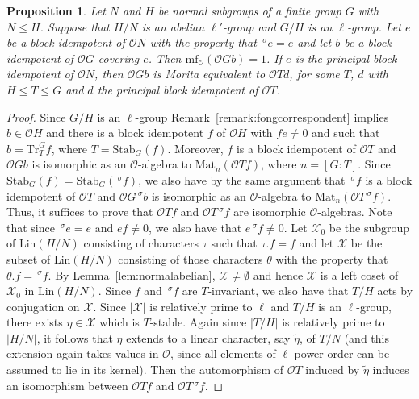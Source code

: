 \documentclass{amsart}
\theoremstyle{plain}\newtheorem{Theorem}{Theorem}[section]
\theoremstyle{plain}\newtheorem{Conjecture}[Theorem]{Conjecture}
\theoremstyle{plain}\newtheorem{Corollary}[Theorem]{Corollary}
\theoremstyle{plain}\newtheorem{Lemma}[Theorem]{Lemma}
\theoremstyle{plain}\newtheorem{Proposition}[Theorem]{Proposition}
\theoremstyle{definition}\newtheorem{Definition}[Theorem]{Definition}
\theoremstyle{definition}\newtheorem{Example}[Theorem]{Example}
\theoremstyle{definition}\newtheorem{Examples}[Theorem]{Examples}
\theoremstyle{definition}\newtheorem{Exercise}[Theorem]{Exercise}
\theoremstyle{definition}\newtheorem{Notation}[Theorem]{Notation}
\theoremstyle{definition}\newtheorem{Remark}[Theorem]{Remark}
\theoremstyle{definition}\newtheorem{Remarks}[Theorem]{Remarks}
\def\CO{{\mathcal{O}}}    \def\OPE{{\mathcal{O}(P\rtimes E)}}
\def\CX{{\mathcal{X}}}
\def\Tr{\mathrm{Tr}}             \def\tenOT{\otimes_{\mathcal{O}T}}
\def\mf{\mathrm{mf}}             \def\tenOGb{\otimes_{\mathcal{O}Gb}}
\def\Stab{\mathrm{Stab}}
\numberwithin{equation}{section}
\begin{document}
\begin{Proposition} \label{prop:frobeniusnormal}   Let $N$
and $H$ be normal subgroups of a  finite group $G$ with $N \leq H$. Suppose that  $H/N$ is  an abelian $\ell'$-group and  $G/H$ is an $\ell$-group.    Let $e$  be a block idempotent of  $\CO N $  with the property that $\,^\sigma  e = e$  and let $b$ be a block idempotent of $\CO G$  covering  $e$. Then $\mf_\CO(\CO G b)=1$.     If   $e$ is the principal block  idempotent of $\CO N$, then  $\CO Gb $  is Morita equivalent to  $\CO  Td$,   for some $T$, $d$  with  $ H\leq  T \leq G$  and   $d$ the principal block idempotent of   $\CO T$.
\end{Proposition}



\begin{proof}    Since $G/H$ is an $\ell$-group Remark~\ref{remark:fongcorrespondent} implies $b \in   \CO  H$  and there is  a  block idempotent $f$ of $\CO H $  with $fe \ne 0 $   and  such that  $b= \Tr_{T}^G  f$, where  $T=  \Stab_G(f)$. Moreover, $f$  is a block idempotent of  $\CO T$  and   $\CO  Gb $  is isomorphic  as an $\CO$-algebra to  $\mathrm{Mat}_n (\CO  T f)$, where $ n= [G : T]$.     Since  $\Stab_G(f)  = \Stab_G (\,^\sigma f) $, we   also have   by the same argument that  
$\,^\sigma f $ is a block idempotent  of $\CO T $ and $\CO G \,^\sigma b $  is isomorphic  as an $\CO$-algebra  to  $\mathrm{Mat}_n (\CO T \,^\sigma f)$. Thus, it suffices to prove that  $\CO  T f  $  and  $\CO  T\,^\sigma f $  are  isomorphic  $\CO$-algebras.   Note that   since  $\,^\sigma e =e$  and $ e f \ne 0$, we also have that  $e \, ^\sigma f \ne 0 $.    
Let $\CX_0$ be the subgroup of  $\mathrm{Lin}(H/N)$  consisting  of  characters $\tau  $  such that $\tau. f =f$ and  let 
 $\CX $  be the subset  of  $\mathrm{Lin}(H/N) $  consisting of  those characters $\theta $   with the property  that $\theta. f =  \,^\sigma  f $.   By Lemma~\ref{lem:normalabelian},  $\CX \ne \emptyset  $  and  hence  $\CX $ is   a left coset  of $\CX_0 $  in $ \mathrm{Lin} (H/N)$.  Since $f$ and $\,^\sigma f $ are $T$-invariant, we also have that  $T/H$ acts by conjugation on   $\CX $.  Since   $|\CX |$  is relatively  prime to $\ell$  and $ T/H$  is  an $\ell$-group, there exists  $\eta \in \CX $  which is $T$-stable.    Again since  $|T/H|$  is relatively prime to  $|H/N|$, it follows that $\eta $  extends to a linear character, say $\tilde \eta $,    of $T/N$ (and this extension again takes values in $\CO$, since all elements of $\ell$-power order can be assumed to lie in its kernel). Then the   automorphism of  $\CO T $  induced by $\tilde \eta $   induces an  isomorphism between $\CO T f$ and  $\CO T \,^\sigma f$.


\end{proof}
\end{document}
